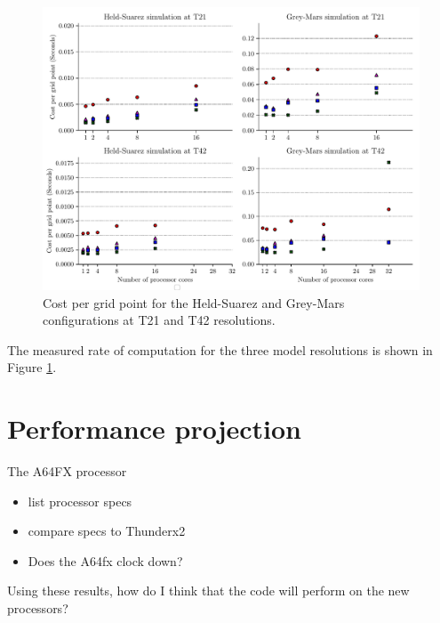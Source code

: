 \documentclass[a4paper,11pt]{report}
\begin{document}
\begin{figure}[htbp]
\begin{center}
\includegraphics[width=1\textwidth]{img/cost-per-grid-point.pdf} 
\caption{Cost per grid point for the Held-Suarez and Grey-Mars configurations at T21 and T42 resolutions.}
\label{fig:cost-per-grid-point}
\end{center}
\end{figure}
\par
The measured rate of computation for the three model resolutions is shown in Figure \ref{fig:cost-per-grid-point}.



\section{Performance projection}
The A64FX processor
\begin{itemize}
\item list processor specs
\item compare specs to Thunderx2
\item Does the A64fx clock down?
\end{itemize}
Using these results, how do I think that the code will perform on the new processors?
\end{document}
